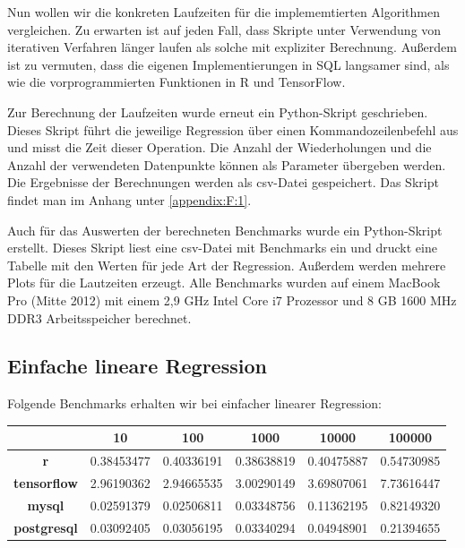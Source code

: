 Nun wollen wir die konkreten Laufzeiten für die implememtierten Algorithmen vergleichen. Zu erwarten ist auf jeden Fall, dass Skripte unter Verwendung von iterativen Verfahren länger laufen als solche mit expliziter Berechnung. Außerdem ist zu vermuten, dass die eigenen Implementierungen in SQL langsamer sind, als wie die vorprogrammierten Funktionen in R und TensorFlow.

Zur Berechnung der Laufzeiten wurde erneut ein Python-Skript geschrieben. Dieses Skript führt die jeweilige Regression über einen Kommandozeilenbefehl aus und misst die Zeit dieser Operation. Die Anzahl der Wiederholungen und die Anzahl der verwendeten Datenpunkte können als Parameter übergeben werden. Die Ergebnisse der Berechnungen werden als csv-Datei gespeichert. Das Skript findet man im Anhang unter \ref{appendix:F:1}.

Auch für das Auswerten der berechneten Benchmarks wurde ein Python-Skript erstellt. Dieses Skript liest eine csv-Datei mit Benchmarks ein und druckt eine Tabelle mit den Werten für jede Art der Regression. Außerdem werden mehrere Plots für die Lautzeiten erzeugt. Alle Benchmarks wurden auf einem MacBook Pro (Mitte 2012) mit einem 2,9 GHz Intel Core i7 Prozessor und 8 GB 1600 MHz DDR3 Arbeitsspeicher berechnet.

\subsection{Einfache lineare Regression}
\label{subsection:4:2:1}

Folgende Benchmarks erhalten wir bei einfacher linearer Regression:

\begin{center}
  \begin{tabular}{|c|c|c|c|c|c|}\hline
    & \textbf{10} & \textbf{100} & \textbf{1000} & \textbf{10000} & \textbf{100000} \\ \hline
    \textbf{r} & 0.38453477 & 0.40336191 & 0.38638819 & 0.40475887 & 0.54730985 \\ \hline
    \textbf{tensorflow} & 2.96190362 & 2.94665535 & 3.00290149 & 3.69807061 & 7.73616447 \\ \hline
    \textbf{mysql} & 0.02591379 & 0.02506811 & 0.03348756 & 0.11362195 & 0.82149320 \\ \hline
    \textbf{postgresql} & 0.03092405 & 0.03056195 & 0.03340294 & 0.04948901 & 0.21394655 \\ \hline
  \end{tabular}
\end{center}


